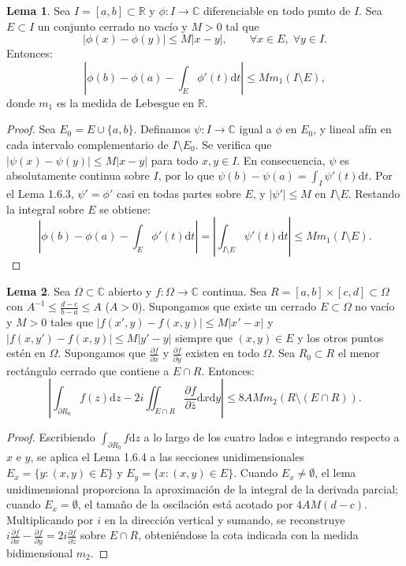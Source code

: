 \documentclass[11pt,a4paper]{article}
\theoremstyle{definition}
\newtheorem{lema}{Lema}[section]
\theoremstyle{remark}
\numberwithin{equation}{section}
\newcommand{\dz}{\mathrm{d}z}
\newcommand{\dt}{\mathrm{d}t}
\begin{document}
\begin{lema}
Sea $I = [a,b] \subset \mathbb{R}$ y $\phi: I \to \mathbb{C}$ diferenciable en todo punto de $I$. Sea $E \subset I$ un conjunto cerrado no vacío y $M > 0$ tal que
\begin{equation}
|\phi(x) - \phi(y)| \le M |x - y|, \qquad \forall x \in E, \; \forall y \in I.
\end{equation}
Entonces:
\begin{equation}
\left| \phi(b) - \phi(a) - \int_E \phi'(t) \dt \right| \le M m_1(I \setminus E),
\end{equation}
donde $m_1$ es la medida de Lebesgue en $\mathbb{R}$.
\end{lema}
\begin{proof}
Sea $E_0 = E \cup \{a,b\}$. Definamos $\psi: I \to \mathbb{C}$ igual a $\phi$ en $E_0$, y lineal afín en cada intervalo complementario de $I \setminus E_0$. Se verifica que $|\psi(x) - \psi(y)| \le M |x-y|$ para todo $x,y \in I$. En consecuencia, $\psi$ es absolutamente continua sobre $I$, por lo que $\psi(b) - \psi(a) = \int_I \psi'(t) \dt$. Por el Lema 1.6.3, $\psi' = \phi'$ casi en todas partes sobre $E$, y $|\psi'| \le M$ en $I \setminus E$. Restando la integral sobre $E$ se obtiene:
\[
|\phi(b) - \phi(a) - \int_E \phi'(t)\dt| = \left| \int_{I \setminus E} \psi'(t)\dt \right| \le M m_1(I \setminus E).
\]
\end{proof}

\begin{lema}
Sea $\Omega \subset \mathbb{C}$ abierto y $f: \Omega \to \mathbb{C}$ continua. Sea $R = [a,b] \times [c,d] \subset \Omega$ con $A^{-1} \le \frac{d-c}{b-a} \le A$ ($A > 0$). Supongamos que existe un cerrado $E \subset \Omega$ no vacío y $M > 0$ tales que $|f(x',y) - f(x,y)| \le M|x'-x|$ y $|f(x,y') - f(x,y)| \le M|y'-y|$ siempre que $(x,y) \in E$ y los otros puntos estén en $\Omega$.
Supongamos que $\frac{\partial f}{\partial x}$ y $\frac{\partial f}{\partial y}$ existen en todo $\Omega$. Sea $R_0 \subset R$ el menor rectángulo cerrado que contiene a $E \cap R$. Entonces:
\begin{equation}
\left| \int_{\partial R_0} f(z) \dz - 2i \iint_{E \cap R} \frac{\partial f}{\partial \bar{z}} \mathrm{d}x\mathrm{d}y \right| \le 8 A M m_2(R \setminus (E \cap R)).
\end{equation}
\end{lema}
\begin{proof}
Escribiendo $\int_{\partial R_0} f \dz$ a lo largo de los cuatro lados e integrando respecto a $x$ e $y$, se aplica el Lema 1.6.4 a las secciones unidimensionales $E_x = \{y : (x,y) \in E\}$ y $E_y = \{x : (x,y) \in E\}$. Cuando $E_x \neq \emptyset$, el lema unidimensional proporciona la aproximación de la integral de la derivada parcial; cuando $E_x = \emptyset$, el tamaño de la oscilación está acotado por $4AM(d-c)$. Multiplicando por $i$ en la dirección vertical y sumando, se reconstruye $i\frac{\partial f}{\partial x} - \frac{\partial f}{\partial y} = 2i\frac{\partial f}{\partial \bar{z}}$ sobre $E \cap R$, obteniéndose la cota indicada con la medida bidimensional $m_2$.
\end{proof}
\end{document}
